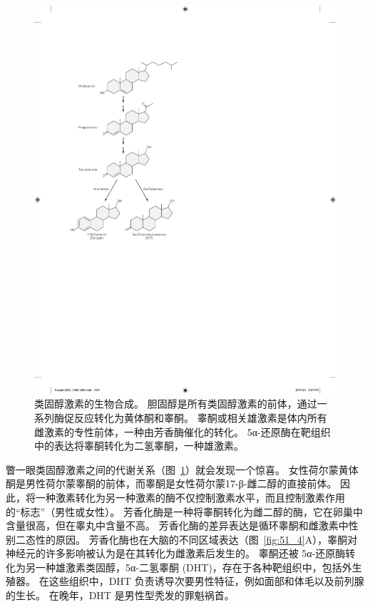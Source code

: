 \begin{figure}[htbp]
	\centering
	\includegraphics[width=0.5\linewidth]{chap51/fig_51_3}
	\caption{类固醇激素的生物合成。 胆固醇是所有类固醇激素的前体，通过一系列酶促反应转化为黄体酮和睾酮。 睾酮或相关雄激素是体内所有雌激素的专性前体，一种由芳香酶催化的转化。 5α-还原酶在靶组织中的表达将睾酮转化为二氢睾酮，一种雄激素。}
	\label{fig:51_3}
\end{figure}


瞥一眼类固醇激素之间的代谢关系（图~\ref{fig:51_3}）就会发现一个惊喜。
女性荷尔蒙黄体酮是男性荷尔蒙睾酮的前体，而睾酮是女性荷尔蒙17-β-雌二醇的直接前体。
因此，将一种激素转化为另一种激素的酶不仅控制激素水平，而且控制激素作用的“标志”（男性或女性）。
芳香化酶是一种将睾酮转化为雌二醇的酶，它在卵巢中含量很高，但在睾丸中含量不高。
芳香化酶的差异表达是循环睾酮和雌激素中性别二态性的原因。
芳香化酶也在大脑的不同区域表达（图~\ref{fig:51_4}A），睾酮对神经元的许多影响被认为是在其转化为雌激素后发生的。
睾酮还被 5α-还原酶转化为另一种雄激素类固醇，5α-二氢睾酮 (DHT)，存在于各种靶组织中，包括外生殖器。
在这些组织中，DHT 负责诱导次要男性特征，例如面部和体毛以及前列腺的生长。
在晚年，DHT 是男性型秃发的罪魁祸首。


